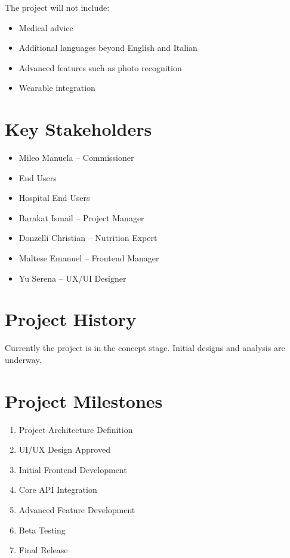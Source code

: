 \documentclass[11pt,a4paper]{article}
\begin{document}
    The project will not include:

    \begin{itemize}
        \item Medical advice
        \item Additional languages beyond English and Italian
        \item Advanced features such as photo recognition
        \item Wearable integration
    \end{itemize}

    \section*{Key Stakeholders}

    \begin{itemize}
        \item Mileo Manuela -- Commissioner
        \item End Users
        \item Hospital End Users
        \item Barakat Ismail -- Project Manager
        \item Donzelli Christian -- Nutrition Expert
        \item Maltese Emanuel -- Frontend Manager
        \item Yu Serena -- UX/UI Designer
    \end{itemize}

    \section*{Project History}

    Currently the project is in the concept stage. Initial designs and analysis are underway.

    \section*{Project Milestones}

    \begin{enumerate}

        \item Project Architecture Definition

        \item UI/UX Design Approved

        \item Initial Frontend Development

        \item Core API Integration

        \item Advanced Feature Development

        \item Beta Testing

        \item Final Release

    \end{enumerate}
\end{document}
